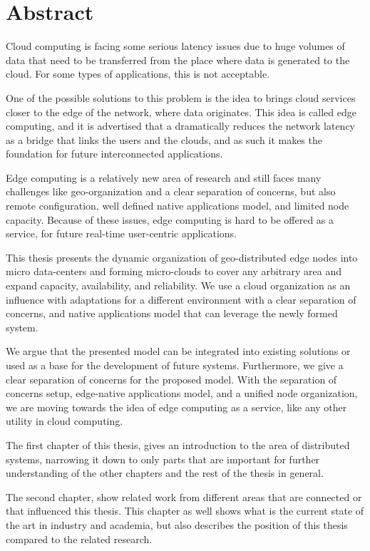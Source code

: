 \chapter*{Abstract}
Cloud computing is facing some serious latency issues due to huge volumes of data that need to be transferred from the place where data is generated to the cloud. For some types of applications, this is not acceptable. 

One of the possible solutions to this problem is the idea to brings cloud services closer to the edge of the network, where data originates. This idea is called edge computing, and it is advertised that a dramatically reduces the network latency as a bridge that links the users and the clouds, and as such it makes the foundation for future interconnected applications.

Edge computing is a relatively new area of research
and still faces many challenges like geo-organization and a clear separation of concerns, but also remote configuration, well defined native applications model, and limited node capacity. Because of these issues, edge computing is hard to be offered as a service, for future real-time user-centric applications. 

This thesis presents the dynamic organization of geo-distributed edge nodes into micro data-centers and forming micro-clouds to cover any arbitrary area and expand capacity, availability, and reliability. We use a cloud organization as an influence with adaptations for a different environment with a clear separation of concerns, and native applications model that can leverage the newly formed system.

We argue that the presented model can be integrated into existing solutions or used as a base for the development of future systems. Furthermore, we give a clear separation of concerns for the proposed model. With the separation of concerns setup, edge-native applications model, and a unified node organization, we are moving towards the idea of edge computing as a service, like any other utility in cloud computing. 

The first chapter of this thesis, gives an introduction to the area of distributed systems, narrowing it down to only parts that are important for further understanding of the other chapters and the rest of the thesis in general.

The second chapter, show related work from different areas that are connected or that influenced this thesis. This chapter as well shows what is the current state of the art in industry and academia, but also describes the position of this thesis compared to the related research.

